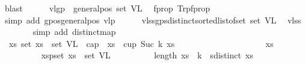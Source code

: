 \begin{isabellebody}
\ blast\isanewline
\ \ \ \ \isamarkupfalse%
\ v{}l{\isacharunderscore}{\kern0pt}gp{\isacharcolon}{\kern0pt}\ \ {\isachardoublequoteopen}general{\isacharunderscore}{\kern0pt}pos\ {\isacharparenleft}{\kern0pt}set\ V{}L{\isacharparenright}{\kern0pt}{\isachardoublequoteclose}\ \isamarkupfalse%
\ f{\isacharunderscore}{\kern0pt}prop{}\ Trp{\isacharparenleft}{\kern0pt}{}{\isacharparenright}{\kern0pt}f{\isacharunderscore}{\kern0pt}prop{}{}\ \isanewline
\ \ \ \ \ \ \isamarkupfalse%
\ {\isacharparenleft}{\kern0pt}simp\ add{\isacharcolon}{\kern0pt}\ gpos{\isacharunderscore}{\kern0pt}generalpos\ v{}lp{\isacharparenright}{\kern0pt}\isanewline
\ \ \ \ \isamarkupfalse%
\ v{}l{\isacharunderscore}{\kern0pt}ssgp{\isacharcolon}{\kern0pt}{\isachardoublequoteopen}sdistinct{\isacharparenleft}{\kern0pt}sorted{\isacharunderscore}{\kern0pt}list{\isacharunderscore}{\kern0pt}of{\isacharunderscore}{\kern0pt}set\ {\isacharparenleft}{\kern0pt}set\ V{}L{\isacharparenright}{\kern0pt}{\isacharparenright}{\kern0pt}{\isachardoublequoteclose}\ \isamarkupfalse%
\ v{}l{\isacharunderscore}{\kern0pt}ss\isanewline
\ \ \ \ \ \ \isamarkupfalse%
\ {\isacharparenleft}{\kern0pt}simp\ add{\isacharcolon}{\kern0pt}\ distinct{\isacharunderscore}{\kern0pt}map{\isacharparenright}{\kern0pt}\isanewline
\ \ \ \ \isamarkupfalse%
\ \ {\isachardoublequoteopen}{\isacharparenleft}{\kern0pt}{\isasymforall}xs{\isachardot}{\kern0pt}\ {\isacharparenleft}{\kern0pt}set\ xs\ {\isasymsubseteq}\ set\ V{}L{\isacharparenright}{\kern0pt}\ {\isasymlongrightarrow}\ {\isasymnot}{\isacharparenleft}{\kern0pt}cap\ {}\ xs\ {\isasymor}\ cup\ {\isacharparenleft}{\kern0pt}Suc\ k{\isacharparenright}{\kern0pt}\ xs{\isacharparenright}{\kern0pt}{\isacharparenright}{\kern0pt}{\isachardoublequoteclose}\isanewline
\ \ \ \ \isamarkupfalse%
{\isacharminus}{\kern0pt}\isanewline
\ \ \ \ \ \ \isakeywordONE{{\isacharbraceleft}{\kern0pt}}\isamarkupfalse%
\isanewline
\ \ \ \ \ \ \ \ \isamarkupfalse%
\ xs\isanewline
\ \ \ \ \ \ \ \ \isamarkupfalse%
\ xsp{\isacharcolon}{\kern0pt}{\isachardoublequoteopen}set\ xs\ {\isasymsubseteq}\ set\ V{}L{\isachardoublequoteclose}\isanewline
\ \ \ \ \ \ \ \ \isamarkupfalse%
\ {\isachardoublequoteopen}length\ xs\ {\isachargreater}{\kern0pt}\ k\ {\isasymLongrightarrow}\ {\isasymnot}sdistinct\ xs{\isachardoublequoteclose}\ \isamarkupfalse%

\end{isabellebody}
